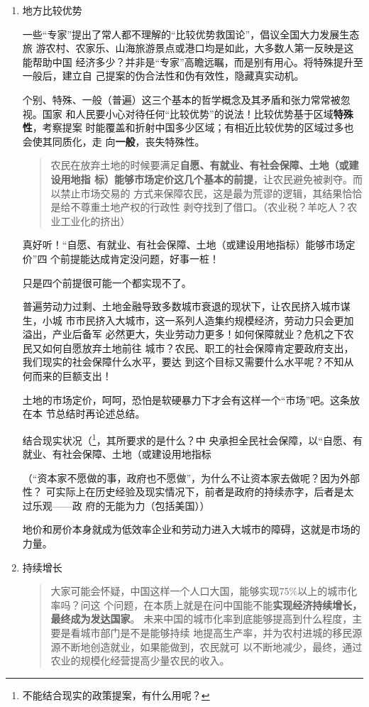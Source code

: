 \begin{enumerate}
\item 地方比较优势

  一些“专家”提出了常人都不理解的“比较优势救国论”，倡议全国大力发展生态旅
  游农村、农家乐、山海旅游景点或港口均是如此，大多数人第一反映是这能帮助中国
  经济多少？并非是“专家”高瞻远瞩，而是别有用心。将特殊提升至一般后，建立自
  己提案的伪合法性和伪有效性，隐藏真实动机。

  个别、特殊、一般（普遍）这三个基本的哲学概念及其矛盾和张力常常被忽视。国家
  和人民要小心对待任何“比较优势”的说法！比较优势基于区域\textbf{特殊性}，考察提案
  时能覆盖和折射中国多少区域；有相近比较优势的区域过多也会使其同质化，走
  向\textbf{一般}，丧失特殊性。

  \begin{quotation}
    农民在放弃土地的时候要满足\textbf{自愿、有就业、有社会保障、土地（或建设用地指
      标）能够市场定价这几个基本的前提}，让农民避免被剥夺。而以禁止市场交易的
    方式来保障农民，这是最为荒谬的逻辑，其结果恰恰是给不尊重土地产权的行政性
    剥夺找到了借口。（农业税？羊吃人？农业工业化的挤出）
  \end{quotation}

  真好听！“自愿、有就业、有社会保障、土地（或建设用地指标）能够市场定价”四
  个前提能达成肯定没问题，好事一桩！

  只是四个前提很可能一个都实现不了。

  普遍劳动力过剩、土地金融导致多数城市衰退的现状下，让农民挤入城市谋生，小城
  市市民挤入大城市，这一系列人造集约规模经济，劳动力只会更加溢出，产业后备军
  必然更大，失业劳动力更多！如何保障就业？危机之下农民又如何自愿放弃土地前往
  城市？农民、职工的社会保障肯定要政府支出，我们现实的社会保障什么水平，要达
  到这个目标又需要什么水平呢？不知从何而来的巨额支出！

  土地的市场定价，呵呵，恐怕是软硬暴力下才会有这样一个“市场”吧。这条放在本
  节总结时再论述总结。

  结合现实状况（\footnote{不能结合现实的政策提案，有什么用呢？}，其所要求的是什么？中
  央承担全民社会保障，以“自愿、有就业、有社会保障、土地（或建设用地指标

  （“资本家不愿做的事，政府也不愿做”，为什么不让资本家去做呢？因为外部性？
  可实际上在历史经验及现实情况下，前者是政府的持续赤字，后者是太过乐观——政
  府的无能为力（包括美国））

  地价和房价本身就成为低效率企业和劳动力进入大城市的障碍，这就是市场的力量。

\item 持续增长

  \begin{quotation}
    大家可能会怀疑，中国这样一个人口大国，能够实现75\%以上的城市化率吗？问这
    个问题，在本质上就是在问中国能不能\textbf{实现经济持续增长，最终成为发达国家}。
    未来中国的城市化率到底能够提高到什么程度，主要是看城市部门是不是能够持续
    地提高生产率，并为农村进城的移民源源不断地创造就业，如果能做到，农民就可
    以不断地减少，最终，通过农业的规模化经营提高少量农民的收入。
  \end{quotation}


\end{enumerate}
